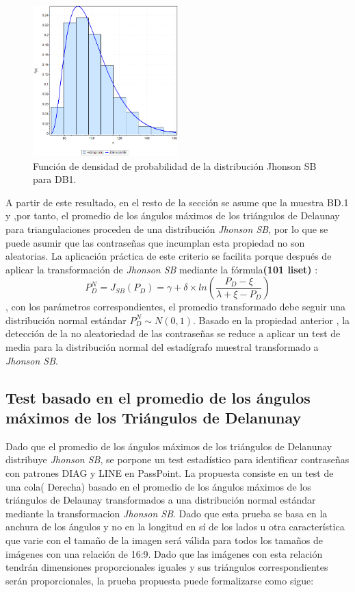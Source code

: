 \documentclass[12pt]{report}
\begin{document}
	  	  	\begin{figure}[ht]
	  	\centering
	  	
	  	\includegraphics[width=0.5\textwidth]{3td_fdp.png}
	  	\caption{Función de densidad de probabilidad de la  distribución Jhonson SB para DB1.}
	  	\label{3TD_FDP}
	  \end{figure}
	  
	  
	 A partir de este resultado, en el resto de la sección se asume que la muestra BD.1 y ,por tanto, el promedio de los ángulos máximos de los triángulos de Delaunay para triangulaciones  proceden de una distribución \textit{Jhonson SB}, por lo que se puede asumir que las contraseñas que incumplan esta propiedad no son aleatorias.
	 La aplicación práctica de este criterio se facilita porque después de  aplicar la transformación de \textit{Jhonson SB}  mediante la fórmula\textbf{(101 liset)} :
	 \[
	 P_D^{N} = J_{SB}(P_D) = \gamma + \delta \times ln\left(\frac{P_D - \xi}{\lambda + \xi - P_D}\right)
	 \],
	 con los parámetros correspondientes, el promedio transformado debe seguir una distribución normal estándar $P_D^{N}\sim N(0,1)$. Basado en la propiedad anterior , la detección de la no aleatoriedad de las contraseñas se reduce a aplicar un test de media para la distribución normal del estadígrafo muestral transformado a \textit{Jhonson SB}.
	 
\subsection{Test basado en el promedio de los ángulos máximos de los Triángulos de Delanunay}
Dado  que el promedio de los ángulos máximos de los triángulos de Delanunay distribuye \textit{Jhonson SB}, se porpone un  test estadístico para identificar contraseñas con patrones DIAG y LINE en PassPoint. La propuesta consiste en un test de una cola( Derecha) basado en el promedio de los ángulos máximos de los triángulos de Delaunay transformados a una distribución normal estándar mediante la transformacion \textit{Jhonson SB}.
Dado que esta prueba se basa en la anchura de los ángulos y no en la longitud en sí de los lados u otra característica que varie con el tamaño de la imagen será válida para todos los tamaños de imágenes con una relación de 16:9. Dado que las imágenes con esta relación tendrán dimensiones proporcionales iguales y sus triángulos correspondientes serán proporcionales, la prueba propuesta puede formalizarse como sigue:
\end{document}
